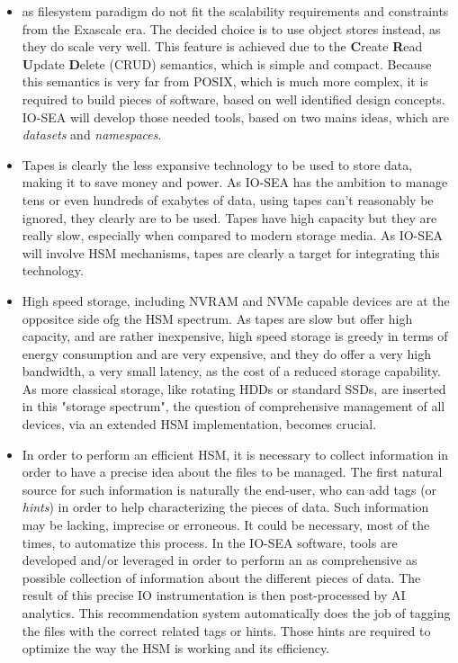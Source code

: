 \begin{itemize}
    \item as filesystem paradigm do not fit the scalability requirements and constraints from the Exascale era.
    The decided choice is to use object stores instead, as they do scale very well. This feature is achieved 
    due to the \textbf{C}reate \textbf{R}ead \textbf{U}pdate \textbf{D}elete (CRUD) semantics, which is simple 
    and compact. Because this semantics is very far from POSIX, which is much more complex, it is required to 
    build pieces of software, based on well identified design concepts. IO-SEA will develop those needed tools, 
    based on two mains ideas, which are \textit{datasets} and \textit{namespaces}. 
    
    \item Tapes is clearly the less expansive technology to be used to store data, making it to save money and 
    power. As IO-SEA has the ambition to manage tens or even hundreds of exabytes of data, using tapes can't
    reasonably be ignored, they clearly are to be used. Tapes have high capacity but they are really slow,
    especially when compared to modern storage media. As IO-SEA will involve HSM mechanisms, tapes are clearly
    a target for integrating this technology.
    
    \item High speed storage, including NVRAM and NVMe capable devices are at the oppositce side ofg the HSM 
    spectrum. As tapes are slow but offer high capacity, and are rather inexpensive, high speed storage is greedy
    in terms of energy consumption and are very expensive, and they do offer a very high bandwidth, a very small
    latency, as the cost of a reduced storage capability. As more classical storage, like rotating HDDs or
    standard SSDs, are inserted in this "storage spectrum", the question of comprehensive management of all
    devices, via an extended HSM implementation, becomes crucial.
    
    \item In order to perform an efficient HSM, it is necessary to collect information in order to have a 
    precise idea about the files to be managed. The first natural source for such information is naturally
    the end-user, who can add tags (or \textit{hints}) in order to help characterizing the pieces of data. Such
    information may be lacking, imprecise or erroneous. It could be necessary, most of the times, to automatize
    this process. In the IO-SEA software, tools are developed and/or leveraged in order to perform an as
    comprehensive as possible collection of information about the different pieces of data. The result of this
    precise IO instrumentation is then post-processed by AI analytics. This recommendation system automatically
    does the job of tagging the files with the correct related tags or hints. Those hints are required to 
    optimize the way the HSM is working and its efficiency. 
    

\end{itemize}
